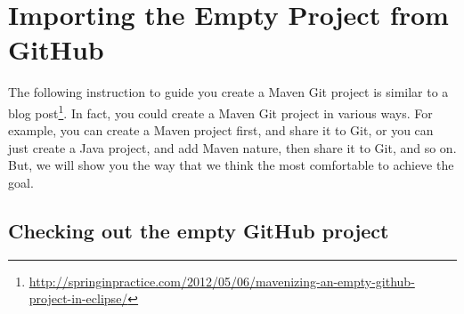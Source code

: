 
\section{Importing the Empty Project from GitHub}

The following instruction to guide you create a Maven Git project is similar to a blog post\footnote{\url{http://springinpractice.com/2012/05/06/mavenizing-an-empty-github-project-in-eclipse/}}. In fact, you could create a Maven Git project in various ways. For example, you can create a Maven project first, and share it to Git, or you can just create a Java project, and add Maven nature, then share it to Git, and so on. But, we will show you the way that we think the most comfortable to achieve the goal.

\subsection{Checking out the empty GitHub project}

